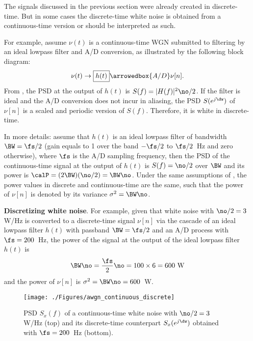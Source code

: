 The signals discussed in the previous section were already created in discrete-time.
But in some cases the discrete-time white noise is obtained from a continuous-time version or should be interpreted as such. 

For example, assume $\nu(t)$ is a continuous-time WGN submitted to filtering by an ideal lowpass filter and A/D conversion, as illustrated by the following block diagram:
\begin{align*}
\nu(t) \rightarrow \fbox{$h(t)$} \arrowedbox{A/D}  \nu[n].
\end{align*}
From , the PSD at the output of $h(t)$ is $S(f)=|H(f)|^2 \no/2$. If the filter is ideal and the A/D conversion does not incur in aliasing, the PSD $S(e^{j \dw})$ of $\nu[n]$ is a scaled and periodic version of $S(f)$. Therefore, it is white in discrete-time.

In more details: assume that $h(t)$ is an ideal lowpass filter of bandwidth $\BW=\fs/2$ (gain equals to 1 over the band $-\fs/2$ to $\fs/2$~Hz and zero otherwise), where $\fs$ is the A/D sampling frequency, 
then the PSD of the continuous-time signal at the output of $h(t)$ is $S(f)=\no/2$ over $\BW$ and its power is $\calP = (2\BW)(\no/2) = \BW \no$.
Under the same assumptions of , the power values in discrete and continuous-time are the same, such that the power of $\nu[n]$ is denoted by its variance $\sigma^2 = \BW \no$.

\bExample \textbf{Discretizing white noise}.
\label{ex:discretizingWhiteNoise}
For example, given that white noise with $\no/2 = 3$ W/Hz is converted to a discrete-time signal $\nu[n]$ via the cascade of an ideal lowpass filter $h(t)$ with passband $\BW=\fs/2$ and an A/D process with $\fs = 200$~Hz, the power of the signal at the output of the ideal lowpass filter $h(t)$ is
\[
\BW \no = \frac {\fs}{2} \no = 100 \times 6 = 600~\textrm{W}
\]
and the power of $\nu[n]$ is $\sigma^2 = \BW \no = 600$~W.

\begin{figure}
\begin{center}
\texttt{[image: ./Figures/awgn\_continuous\_discrete]}
\caption{PSD $S_x(f)$ of a continuous-time white noise with $\no/2=3$ W/Hz (top) and its discrete-time counterpart $S_x(e^{j \dw})$ obtained with $\fs=200$~Hz (bottom). \label{fig:awgn_continuous_discrete}}
\end{center}
\end{figure}

